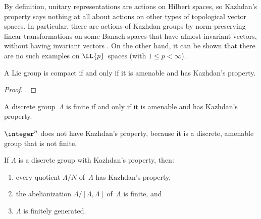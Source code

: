 \begin{warn} \label{TnotBanach}
By definition, unitary representations are actions on Hilbert spaces, so Kazhdan's property says nothing at all about actions on other types of topological vector spaces. In particular, there are actions of Kazhdan groups by norm-preserving linear transformations on some Banach spaces that have almost-invariant vectors, without having invariant vectors . On the other hand, it can be shown that there are no such examples on $\LL{p}$~spaces (with $1 \le p < \infty$).
\end{warn}

\begin{prop} \label{Kazhdan+amenable}
A Lie group is compact if and only if it is amenable and has Kazhdan's
property.
 \end{prop}

\begin{proof} 
.
 \end{proof}
 
 \begin{cor} \label{T+amen->finite}
 A discrete group~$\Lambda$ is finite if and only if it is amenable and has Kazhdan's
property.
\end{cor}

\begin{eg}
$\integer^n$ does not have Kazhdan's property, because it is a discrete, amenable group that is not finite.
\end{eg}

\begin{prop} \label{KazhdanEasy} 
If $\Lambda$ is a discrete group with Kazhdan's property, then:
\begin{enumerate}
\item \label{KazhdanEasy-quotient}
every quotient $\Lambda/N$ of~$\Lambda$ has Kazhdan's property,
\item \label{KazhdanEasy-Abel}
 the abelianization $\Lambda/[\Lambda,\Lambda]$ of~$\Lambda$ is finite,
 and
 \item \label{KazhdanEasy-fg}
 $\Lambda$ is finitely generated.
\end{enumerate}
 \end{prop}
 
